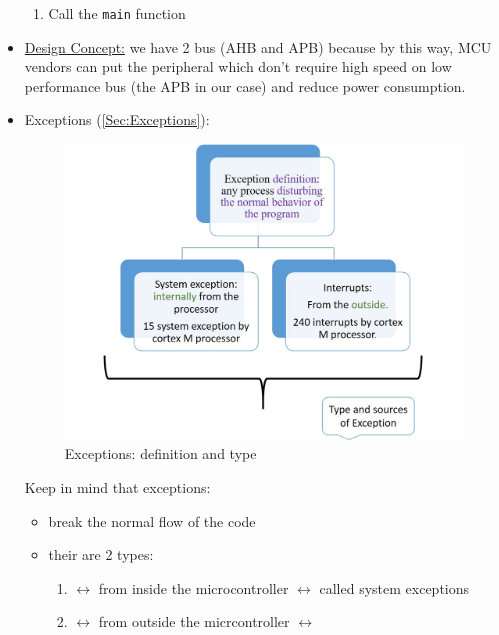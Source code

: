 \begin{itemize}
\begin{enumerate}
    \item Call the \verb|main| function
\end{enumerate}

\item \underline{Design Concept:} we have 2 bus (AHB and APB) because by this way, MCU vendors can put the peripheral which don't require high speed on low performance bus (the APB in our case) and reduce power consumption.

\newpage
\item  Exceptions (\autoref{Sec:Exceptions}):

\begin{figure}[h]
\centering
\includegraphics[scale=0.7]{Figures/ARM_Cortex/exception_def_type}
\caption{Exceptions: definition and type}
\label{fig:ARM_Cortex:exception_def_type}
\end{figure}

Keep in mind that exceptions:

	\begin{itemize}
	
	\item break the normal flow of the code
	
	\item their are 2 types: 
	
	\begin{enumerate}
	\item 	{} $\leftrightarrow$ from inside the microcontroller $\leftrightarrow$ called system exceptions	
	
	\item {} $\leftrightarrow$ from outside the micrcontroller $\leftrightarrow$ 	


\end{enumerate}
\end{itemize}
\end{itemize}
